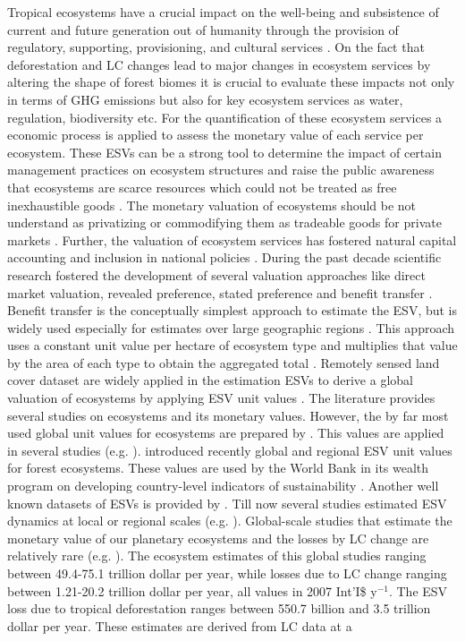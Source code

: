 	Tropical ecosystems have a crucial impact on the well-being and subsistence of current and future generation out of humanity through the provision of regulatory, supporting, provisioning, and cultural services \citep{Costanza1997}. On the fact that deforestation and \ac{LC} changes lead to major changes in ecosystem services by altering the shape of forest biomes it is crucial to evaluate these impacts not only in terms of \ac{GHG} emissions but also for key ecosystem services as water, regulation, biodiversity etc. For the quantification of these ecosystem services a economic process is applied to assess the monetary value of each service per ecosystem. These \acp{ESV} can be a strong tool to determine the impact of certain management practices on ecosystem structures and raise the public awareness that ecosystems are scarce resources which could not be treated as free inexhaustible goods \citep{Groot2012}. The monetary valuation of ecosystems should be not understand as privatizing or commodifying them as tradeable goods for private markets \citep{Costanza2014,Song2018}. Further, the valuation of ecosystem services has fostered natural capital accounting and inclusion in national policies \citep{Song2018}. During the past decade scientific research fostered the development of several valuation approaches like direct market valuation, revealed preference, stated preference and benefit transfer \citep{Song2018}. Benefit transfer is the conceptually simplest approach to estimate the \ac{ESV}, but is widely used especially for estimates over large geographic regions \citep{Costanza1997,Song2018,Costanza2014}. This approach uses a constant unit value per hectare of ecosystem type and multiplies that value by the area of each type to obtain the aggregated total \citep{Costanza2014}. Remotely sensed land cover dataset are widely applied in the estimation \acp{ESV} to derive a global valuation of ecosystems by applying \ac{ESV} unit values \citep{Song2018}. The literature provides several studies on ecosystems and its monetary values. However, the by far most used global unit values for ecosystems are prepared by \citet{Costanza2014}. This values are applied in several studies (e.g. \citet{Costanza2014,Song2018,Sannigrahi2018,Kreuter2001,Wang2006,Zhao2004}). \citet{Siikamaki2015} introduced recently global and regional \ac{ESV} unit values for forest ecosystems. These values are used by the World Bank in its wealth program on developing country-level indicators of sustainability \citep{Siikamaki2015}. Another well known datasets of \acp{ESV} is provided by \citet{Groot2012}. Till now several studies estimated \ac{ESV} dynamics at local or regional scales (e.g. \citet{Kreuter2001,Wang2006,Zhao2004}). Global-scale studies that estimate the monetary value of our planetary ecosystems and the losses by \ac{LC} change are relatively rare (e.g. \citet{Costanza1997,Costanza2014,Sannigrahi2018,Song2018}). The ecosystem estimates of this global studies ranging between 49.4-75.1 trillion dollar per year, while losses due to \ac{LC} change ranging between 1.21-20.2 trillion dollar per year, all values in 2007 Int'I\$ y$^{-1}$. The \ac{ESV} loss due to tropical deforestation ranges between 550.7 billion and 3.5 trillion dollar per year. These estimates are derived from \ac{LC} data at a 